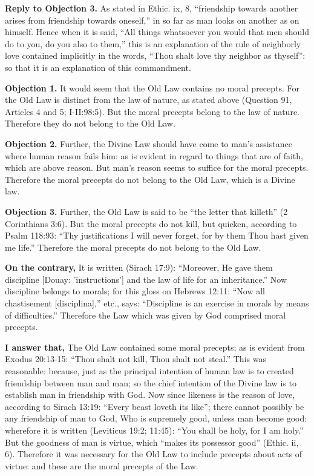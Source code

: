 \textbf{Reply to Objection 3.} As stated in Ethic. ix, 8, ``friendship towards another arises from friendship towards oneself,'' in so far as man looks on another as on himself. Hence when it is said, ``All things whatsoever you would that men should do to you, do you also to them,'' this is an explanation of the rule of neighborly love contained implicitly in the words, ``Thou shalt love thy neighbor as thyself'': so that it is an explanation of this commandment.


\textbf{Objection 1.} It would seem that the Old Law contains no moral precepts. For the Old Law is distinct from the law of nature, as stated above (Question 91, Articles 4 and 5; I-II:98:5). But the moral precepts belong to the law of nature. Therefore they do not belong to the Old Law.

\textbf{Objection 2.} Further, the Divine Law should have come to man's assistance where human reason fails him: as is evident in regard to things that are of faith, which are above reason. But man's reason seems to suffice for the moral precepts. Therefore the moral precepts do not belong to the Old Law, which is a Divine law.

\textbf{Objection 3.} Further, the Old Law is said to be ``the letter that killeth'' (2 Corinthians 3:6). But the moral precepts do not kill, but quicken, according to Psalm 118:93: ``Thy justifications I will never forget, for by them Thou hast given me life.'' Therefore the moral precepts do not belong to the Old Law.

\textbf{On the contrary,} It is written (Sirach 17:9): ``Moreover, He gave them discipline [Douay: 'instructions'] and the law of life for an inheritance.'' Now discipline belongs to morals; for this gloss on Hebrews 12:11: ``Now all chastisement [disciplina],'' etc., says: ``Discipline is an exercise in morals by means of difficulties.'' Therefore the Law which was given by God comprised moral precepts.

\textbf{I answer that,} The Old Law contained some moral precepts; as is evident from Exodus 20:13-15: ``Thou shalt not kill, Thou shalt not steal.'' This was reasonable: because, just as the principal intention of human law is to created friendship between man and man; so the chief intention of the Divine law is to establish man in friendship with God. Now since likeness is the reason of love, according to Sirach 13:19: ``Every beast loveth its like''; there cannot possibly be any friendship of man to God, Who is supremely good, unless man become good: wherefore it is written (Leviticus 19:2; 11:45): ``You shall be holy, for I am holy.'' But the goodness of man is virtue, which ``makes its possessor good'' (Ethic. ii, 6). Therefore it was necessary for the Old Law to include precepts about acts of virtue: and these are the moral precepts of the Law.

